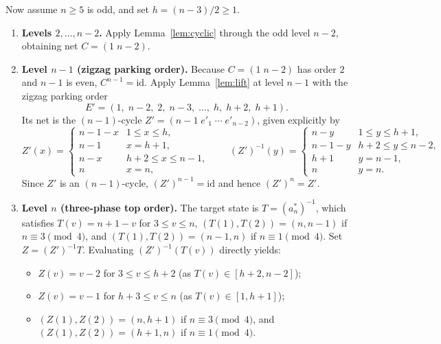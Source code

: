 \documentclass[11pt]{article}
\begin{document}
Now assume $n \ge 5$ is odd, and set $h = (n - 3)/2 \ge 1$.
\begin{enumerate}
\item \textbf{Levels $2,\dots,n-2$.} Apply Lemma~\ref{lem:cyclic} through the odd
level $n - 2$, obtaining net $C = (1\;n-2)$.

\item \textbf{Level $n - 1$ (zigzag parking order).} Because $C = (1\;n-2)$ has
order $2$ and $n - 1$ is even, $C^{n-1} = \mathrm{id}$. Apply
Lemma~\ref{lem:lift} at level $n - 1$ with the zigzag parking order
\[
E' = (1,\; n-2,\; 2,\; n-3,\; \dots,\; h,\; h+2,\; h+1).
\]
Its net is the $(n - 1)$-cycle $Z' = (n - 1\; e'_1\;\cdots\; e'_{n-2})$, given
explicitly by
\[
Z'(x) = \begin{cases}
n - 1 - x & 1 \le x \le h, \\
n - 1 & x = h + 1, \\
n - x & h + 2 \le x \le n - 1, \\
n & x = n,
\end{cases}
\qquad
(Z')^{-1}(y) = \begin{cases}
n - y & 1 \le y \le h + 1, \\
n - 1 - y & h + 2 \le y \le n - 2, \\
h + 1 & y = n - 1, \\
n & y = n.
\end{cases}
\]
Since $Z'$ is an $(n - 1)$-cycle, $(Z')^{n-1} = \mathrm{id}$ and hence $(Z')^n = Z'$.

\item \textbf{Level $n$ (three-phase top order).} The target state is
$T = (a^*_n)^{-1}$, which satisfies $T(v) = n + 1 - v$ for $3 \le v \le n$,
$(T(1), T(2)) = (n, n - 1)$ if $n \equiv 3 \pmod 4$, and
$(T(1), T(2)) = (n - 1, n)$ if $n \equiv 1 \pmod 4$. Set $Z = (Z')^{-1} T$.
Evaluating $(Z')^{-1}(T(v))$ directly yields:
\begin{itemize}
\item $Z(v) = v - 2$ for $3 \le v \le h + 2$ (as $T(v) \in [h + 2, n - 2]$);
\item $Z(v) = v - 1$ for $h + 3 \le v \le n$ (as $T(v) \in [1, h + 1]$);
\item $(Z(1), Z(2)) = (n, h + 1)$ if $n \equiv 3 \pmod 4$, and
$(Z(1), Z(2)) = (h + 1, n)$ if $n \equiv 1 \pmod 4$.
\end{itemize}
\end{enumerate}
\end{document}
